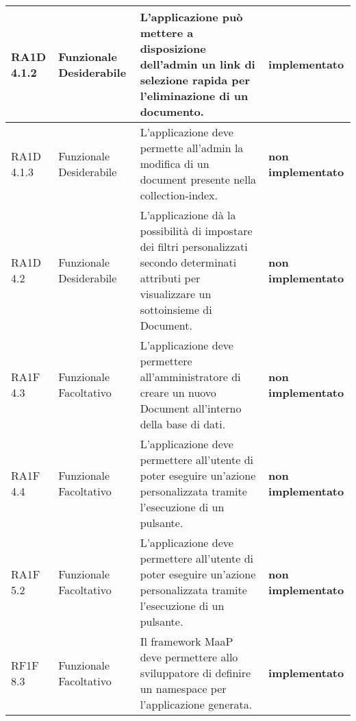 \begin{longtable}{ | l | p{2cm} | p{5cm} | p{4cm}| }
        RA1D 4.1.2 & Funzionale \newline  Desiderabile  & L’applicazione può mettere a disposizione dell’admin un link di selezione rapida per l’eliminazione di un documento. \newline & \textbf{{\color{green} implementato}} \newline \\ \hline      
        RA1D 4.1.3 & Funzionale \newline  Desiderabile  & L’applicazione deve permette all’admin la modifica di un document presente nella collection-index. & \textbf{{\color{red} non implementato}} \newline\\ \hline      
        RA1D 4.2 & Funzionale \newline  Desiderabile  & L’applicazione dà la possibilità di impostare dei filtri personalizzati secondo determinati attributi per visualizzare un sottoinsieme di Document.  & \textbf{{\color{red}non implementato}} \newline \\ \hline      
        RA1F 4.3 & Funzionale \newline  Facoltativo  & L’applicazione deve permettere all’amministratore di creare un nuovo Document all’interno della base di dati. & \textbf{{\color{red} non implementato}} \newline \\ \hline      
        RA1F 4.4 & Funzionale \newline  Facoltativo  & L’applicazione deve permettere all’utente di poter eseguire un’azione personalizzata tramite l’esecuzione di un pulsante. & \textbf{{\color{red} non implementato}} \newline  \\ \hline      
        
        RA1F 5.2 & Funzionale \newline  Facoltativo  & L’applicazione deve permettere all’utente di poter eseguire un’azione personalizzata tramite l’esecuzione di un pulsante. & \textbf{{\color{red} non implementato}} \newline  \\ \hline      
             
           
        RF1F 8.3 & Funzionale \newline  Facoltativo  & Il framework MaaP deve permettere allo sviluppatore di definire un namespace per l’applicazione generata. & \textbf{{\color{green} implementato}} \newline  \\ \hline      
        

\end{longtable}
